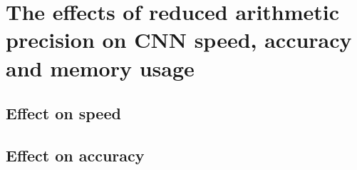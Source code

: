 \chapter{The effects of reduced arithmetic precision on CNN speed, accuracy and memory usage}

\section{Effect on speed}

\section{Effect on accuracy}